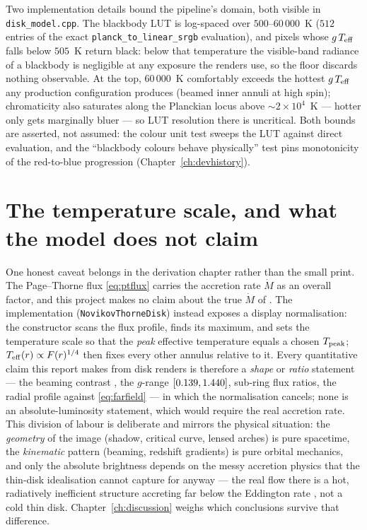 Two implementation details bound the pipeline's domain, both visible
in \texttt{disk\_model.cpp}. The blackbody LUT is log-spaced over
$500$--$60\,000$~K ($512$ entries of the exact
\texttt{planck\_to\_linear\_srgb} evaluation), and pixels whose
$g\,T_{\rm eff}$ falls below $505$~K return black: below that
temperature the visible-band radiance of a blackbody is negligible at
any exposure the renders use, so the floor discards nothing
observable. At the top, $60\,000$~K comfortably exceeds the hottest
$g\,T_{\rm eff}$ any production configuration produces (beamed inner
annuli at high spin); chromaticity also saturates along the Planckian
locus above $\sim$$2\times10^4$~K — hotter only gets marginally bluer
— so LUT resolution there is uncritical. Both bounds are asserted,
not assumed: the colour unit test sweeps the LUT against direct
evaluation, and the ``blackbody colours behave physically'' test pins
monotonicity of the red-to-blue progression
(Chapter~\ref{ch:devhistory}).

\section{The temperature scale, and what the model does not claim}
\label{sec:tempscale}

One honest caveat belongs in the derivation chapter rather than the
small print. The Page--Thorne flux \eqref{eq:ptflux} carries the
accretion rate $\dot M$ as an overall factor, and this project makes
no claim about the true $\dot M$ of \sgra{}. The implementation
(\texttt{NovikovThorneDisk}) instead exposes a display normalisation:
the constructor scans the flux profile, finds its maximum, and sets
the temperature scale so that the \emph{peak} effective temperature
equals a chosen $T_{\rm peak}$; $T_{\rm eff}(r) \propto F(r)^{1/4}$
then fixes every other annulus relative to it. Every quantitative
claim this report makes from disk renders is therefore a \emph{shape}
or \emph{ratio} statement — the beaming contrast \BeamRatio{}, the
$g$-range $[0.139, 1.440]$, sub-ring flux ratios, the radial profile
against \eqref{eq:farfield} — in which the normalisation cancels;
none is an absolute-luminosity statement, which would require the real
accretion rate. This division of labour is deliberate and mirrors the
physical situation: the \emph{geometry} of the image (shadow, critical
curve, lensed arches) is pure spacetime, the \emph{kinematic} pattern
(beaming, redshift gradients) is pure orbital mechanics, and only the
absolute brightness depends on the messy accretion physics that the
thin-disk idealisation cannot capture for \sgra{} anyway — the real
flow there is a hot, radiatively inefficient structure accreting far
below the Eddington rate \citep{Broderick2014, EHT2022}, not a cold
thin disk. Chapter~\ref{ch:discussion} weighs which conclusions
survive that difference.

